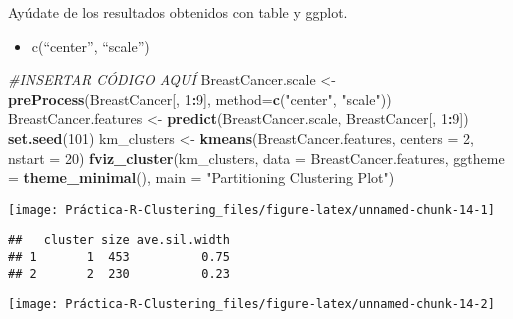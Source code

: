 \documentclass[]{article}
\newenvironment{Shaded}{\begin{snugshade}}{\end{snugshade}}
\newcommand{\CommentTok}[1]{\textcolor[rgb]{0.56,0.35,0.01}{\textit{#1}}}
\newcommand{\DataTypeTok}[1]{\textcolor[rgb]{0.13,0.29,0.53}{#1}}
\newcommand{\DecValTok}[1]{\textcolor[rgb]{0.00,0.00,0.81}{#1}}
\newcommand{\KeywordTok}[1]{\textcolor[rgb]{0.13,0.29,0.53}{\textbf{#1}}}
\newcommand{\NormalTok}[1]{#1}
\newcommand{\OperatorTok}[1]{\textcolor[rgb]{0.81,0.36,0.00}{\textbf{#1}}}
\newcommand{\StringTok}[1]{\textcolor[rgb]{0.31,0.60,0.02}{#1}}
\providecommand{\tightlist}{%
  \setlength{\itemsep}{0pt}\setlength{\parskip}{0pt}}
\begin{document}
Ayúdate de los resultados obtenidos con table y ggplot.

\begin{itemize}
\tightlist
\item
  c(``center'', ``scale'')
\end{itemize}

\begin{Shaded}
\begin{Highlighting}[]
\CommentTok{#INSERTAR CÓDIGO AQUÍ}
\NormalTok{BreastCancer.scale <-}\StringTok{ }\KeywordTok{preProcess}\NormalTok{(BreastCancer[, }\DecValTok{1}\OperatorTok{:}\DecValTok{9}\NormalTok{], }\DataTypeTok{method=}\KeywordTok{c}\NormalTok{(}\StringTok{"center"}\NormalTok{, }\StringTok{"scale"}\NormalTok{))}
\NormalTok{BreastCancer.features <-}\StringTok{ }\KeywordTok{predict}\NormalTok{(BreastCancer.scale, BreastCancer[, }\DecValTok{1}\OperatorTok{:}\DecValTok{9}\NormalTok{])}
\KeywordTok{set.seed}\NormalTok{(}\DecValTok{101}\NormalTok{)}
\NormalTok{km_clusters <-}\StringTok{ }\KeywordTok{kmeans}\NormalTok{(BreastCancer.features, }\DataTypeTok{centers =} \DecValTok{2}\NormalTok{, }\DataTypeTok{nstart =} \DecValTok{20}\NormalTok{)}
\KeywordTok{fviz_cluster}\NormalTok{(km_clusters, }\DataTypeTok{data =}\NormalTok{ BreastCancer.features,}
             \DataTypeTok{ggtheme =} \KeywordTok{theme_minimal}\NormalTok{(),}
             \DataTypeTok{main =} \StringTok{"Partitioning Clustering Plot"}\NormalTok{)}
\end{Highlighting}
\end{Shaded}

\begin{center}\texttt{[image: Práctica-R-Clustering\_files/figure-latex/unnamed-chunk-14-1]} \end{center}

\begin{Shaded}
\end{Shaded}

\begin{verbatim}
##   cluster size ave.sil.width
## 1       1  453          0.75
## 2       2  230          0.23
\end{verbatim}

\begin{center}\texttt{[image: Práctica-R-Clustering\_files/figure-latex/unnamed-chunk-14-2]} \end{center}
\end{document}
